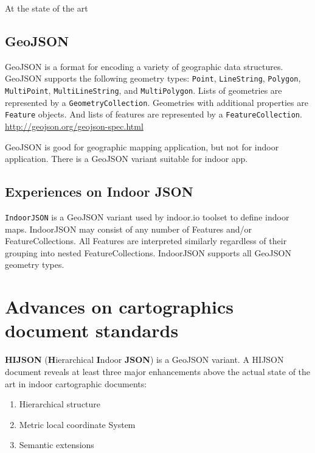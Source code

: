\documentclass[]{article}
\begin{document}
At the state of the art

\subsection{GeoJSON}\label{geojson}

GeoJSON is a format for encoding a variety of geographic data
structures. GeoJSON supports the following geometry types:
\texttt{Point}, \texttt{LineString}, \texttt{Polygon},
\texttt{MultiPoint}, \texttt{MultiLineString}, and
\texttt{MultiPolygon}. Lists of geometries are represented by a
\texttt{GeometryCollection}. Geometries with additional properties are
\texttt{Feature} objects. And lists of features are represented by a
\texttt{FeatureCollection}.
\href{GeoJSON\%20spec}{http://geojson.org/geojson-spec.html}

GeoJSON is good for geographic mapping application, but not for indoor
application. There is a GeoJSON variant suitable for indoor app.

\subsection{Experiences on Indoor
JSON}\label{experiences-on-indoor-json}

\texttt{IndoorJSON} is a GeoJSON variant used by indoor.io toolset to
define indoor maps. IndoorJSON may consist of any number of Features
and/or FeatureCollections. All Features are interpreted similarly
regardless of their grouping into nested FeatureCollections. IndoorJSON
supports all GeoJSON geometry types.

\section{Advances on cartographics document
standards}\label{advances-on-cartographics-document-standards}

\textbf{HIJSON} (\textbf{H}ierarchical \textbf{I}ndoor \textbf{JSON}) is
a GeoJSON variant. A HIJSON document reveals at least three major
enhancements above the actual state of the art in indoor cartographic
documents:

\begin{enumerate}
\def\labelenumi{\arabic{enumi}.}
\itemsep1pt\parskip0pt
\item
  Hierarchical structure
\item
  Metric local coordinate System
\item
  Semantic extensions
\end{enumerate}
\end{document}
